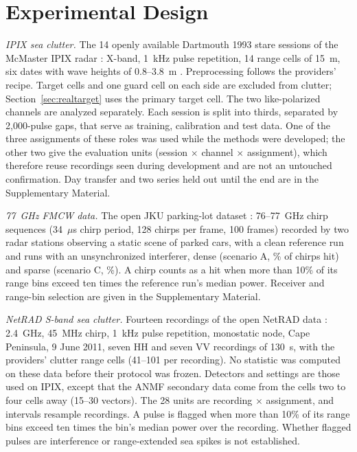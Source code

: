 \documentclass[journal]{IEEEtran}
\begin{document}
\section{Experimental Design}\label{sec:design}
\emph{IPIX sea clutter.} The 14 openly available Dartmouth 1993 stare sessions of the McMaster IPIX radar \cite{ipixweb}: X-band, 1~kHz pulse repetition, 14 range cells of 15~m, six dates with wave heights of 0.8--3.8~m \cite{haykin1995}. Preprocessing follows the providers' recipe. Target cells and one guard cell on each side are excluded from clutter; Section~\ref{sec:realtarget} uses the primary target cell. The two like-polarized channels are analyzed separately. Each session is split into thirds, separated by 2,000-pulse gaps, that serve as training, calibration and test data. One of the three assignments of these roles was used while the methods were developed; the other two give the \NUnitsConf{} evaluation units (session $\times$ channel $\times$ assignment), which therefore reuse recordings seen during development and are not an untouched confirmation. Day transfer and two series held out until the end are in the Supplementary Material.

\emph{77~GHz FMCW data.} The open JKU parking-lot dataset \cite{jku2026}: 76--77~GHz chirp sequences (34~$\mu$s chirp period, 128 chirps per frame, 100 frames) recorded by two radar stations observing a static scene of parked cars, with a clean reference run and runs with an unsynchronized interferer, dense (scenario A, \JHitA\% of chirps hit) and sparse (scenario C, \JHitC\%). A chirp counts as a hit when more than 10\% of its range bins exceed ten times the reference run's median power. Receiver and range-bin selection are given in the Supplementary Material.

\emph{NetRAD S-band sea clutter.} Fourteen recordings of the open NetRAD data \cite{netrad2026,fioranelli2016netrad}: 2.4~GHz, 45~MHz chirp, 1~kHz pulse repetition, monostatic node, Cape Peninsula, 9 June 2011, seven HH and seven VV recordings of 130~s, with the providers' clutter range cells (41--101 per recording). No statistic was computed on these data before their protocol was frozen. Detectors and settings are those used on IPIX, except that the ANMF secondary data come from the cells two to four cells away (15--30 vectors). The 28 units are recording $\times$ assignment, and intervals resample recordings. A pulse is flagged when more than 10\% of its range bins exceed ten times the bin's median power over the recording. Whether flagged pulses are interference or range-extended sea spikes is not established.
\end{document}
